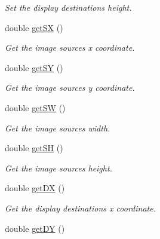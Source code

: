 \begin{DoxyCompactItemize}
\begin{DoxyCompactList}\small\item\em Set the display destinations height. \end{DoxyCompactList}\item 
double \hyperlink{classObject_a0f2d1703de76d3b7df5695962fe9dcc1}{get\+SX} ()\hypertarget{classObject_a0f2d1703de76d3b7df5695962fe9dcc1}{}\label{classObject_a0f2d1703de76d3b7df5695962fe9dcc1}

\begin{DoxyCompactList}\small\item\em Get the image sources x coordinate. \end{DoxyCompactList}\item 
double \hyperlink{classObject_a1ca9433993915dfb694d52c83494e73f}{get\+SY} ()\hypertarget{classObject_a1ca9433993915dfb694d52c83494e73f}{}\label{classObject_a1ca9433993915dfb694d52c83494e73f}

\begin{DoxyCompactList}\small\item\em Get the image sources y coordinate. \end{DoxyCompactList}\item 
double \hyperlink{classObject_aace84f90379d216d6f1e54b0aa4442d5}{get\+SW} ()\hypertarget{classObject_aace84f90379d216d6f1e54b0aa4442d5}{}\label{classObject_aace84f90379d216d6f1e54b0aa4442d5}

\begin{DoxyCompactList}\small\item\em Get the image sources width. \end{DoxyCompactList}\item 
double \hyperlink{classObject_a45fac8f64cae5bbc8566e69fb80037bf}{get\+SH} ()\hypertarget{classObject_a45fac8f64cae5bbc8566e69fb80037bf}{}\label{classObject_a45fac8f64cae5bbc8566e69fb80037bf}

\begin{DoxyCompactList}\small\item\em Get the image sources height. \end{DoxyCompactList}\item 
double \hyperlink{classObject_a16e291133d12358785e1bcc044615bcd}{get\+DX} ()\hypertarget{classObject_a16e291133d12358785e1bcc044615bcd}{}\label{classObject_a16e291133d12358785e1bcc044615bcd}

\begin{DoxyCompactList}\small\item\em Get the display destinations x coordinate. \end{DoxyCompactList}\item 
double \hyperlink{classObject_a6b011de1c1529d64b2cf3828f0450180}{get\+DY} ()\hypertarget{classObject_a6b011de1c1529d64b2cf3828f0450180}{}\label{classObject_a6b011de1c1529d64b2cf3828f0450180}


\end{DoxyCompactItemize}
